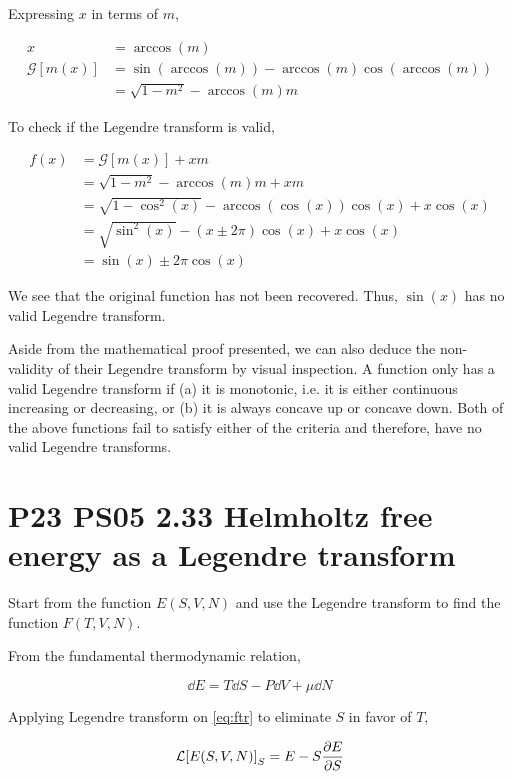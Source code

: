 \documentclass[9pt,a4paper,twocolumn]{article}
\begin{document}
\begin{enumerate}[(a)]
Expressing $x$ in terms of $m$,

\begin{align}
	x &= \arccos(m) \\
	\mathcal{G}[m(x)] &= \sin(\arccos(m)) - \arccos(m)\cos(\arccos(m)) \nonumber \\
	&= \sqrt{1-m^2} - \arccos(m)m
\end{align}

To check if the Legendre transform is valid,

\begin{align}
	f(x) &= \mathcal{G}[m(x)] + xm \\
	&= \sqrt{1-m^2} - \arccos(m)m + xm \\
	&= \sqrt{1-\cos^2(x)} - \arccos(\cos(x))\cos(x) + x\cos(x) \nonumber \\
	&= \sqrt{\sin^2(x)} - (x \pm 2\pi)\cos(x) + x\cos(x) \\
	&= \sin(x) \pm 2\pi\cos(x)
\end{align}

We see that the original function has not been recovered. Thus, $\sin(x)$ has no valid Legendre transform.

Aside from the mathematical proof presented, we can also deduce the non-validity of their Legendre transform by visual inspection. A function only has a valid Legendre transform if (a) it is monotonic, i.e. it is either continuous increasing or decreasing, or (b) it is always concave up or concave down. Both of the above functions fail to satisfy either of the criteria and therefore, have no valid Legendre transforms.

\end{enumerate}

\section{P23 PS05 2.33 Helmholtz free energy as a Legendre transform}

Start from the function $E(S, V,N)$ and use the Legendre transform to find the function $F(T, V,N)$.

From the fundamental thermodynamic relation,

\begin{equation}\label{eq:ftr}
	\dd{E} = T\dd{S} - P\dd{V} + \mu\dd{N}
\end{equation}

Applying Legendre transform on \eqref{eq:ftr} to eliminate $S$ in favor of $T$,

\begin{equation}
	\mathcal{L}\qty[E\qty(S,V,N)]_S = E - S\pdv{E}{S}
\end{equation}
\end{document}
